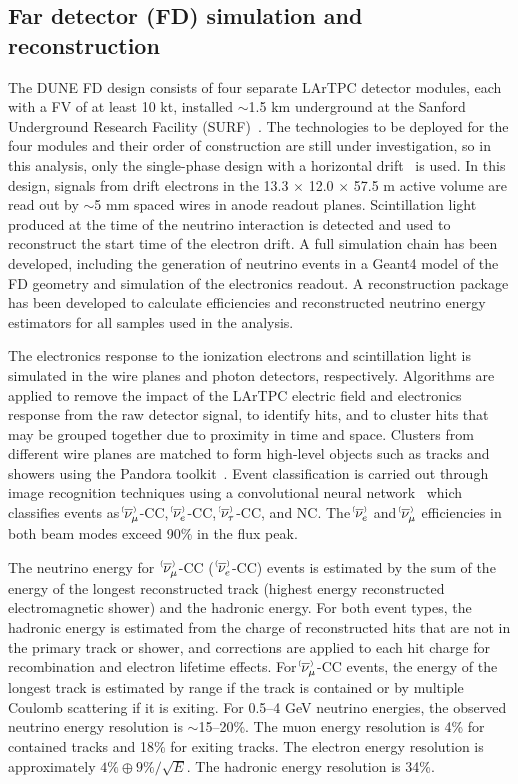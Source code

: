 \subsection{Far detector (FD) simulation and reconstruction}
The DUNE FD design consists of four separate LArTPC detector modules, each with a FV of at least 10 kt, installed $\sim$1.5 km underground at the Sanford Underground Research Facility (SURF)~\cite{Abi:2018dnh}. The technologies to be deployed for the four modules and their order of construction are still under investigation, so in this analysis, only the single-phase design with a horizontal drift~\cite{Abi:2020loh} is used. In this design, signals from drift electrons in the 13.3 $\times$ 12.0 $\times$ 57.5 m active volume are read out by $\sim$5 mm spaced wires in anode readout planes. Scintillation light produced at the time of the neutrino interaction is detected and used to reconstruct the start time of the electron drift. A full simulation chain has been developed, including the generation of neutrino events in a Geant4 model of the FD geometry and simulation of the electronics readout. A reconstruction package has been developed to calculate efficiencies and reconstructed neutrino energy estimators for all samples used in the analysis.

The electronics response to the ionization electrons and scintillation light is simulated in the wire planes and photon detectors, respectively. Algorithms are applied to remove the impact of the LArTPC electric field and electronics response from the raw detector signal, to identify hits, and to cluster hits that may be grouped together due to proximity in time and space. Clusters from different wire planes are matched to form high-level objects such as tracks and showers using the Pandora toolkit~\cite{Marshall:2015rfa,Acciarri:2017hat}. Event classification is carried out through image recognition techniques using a convolutional neural network~\cite{cvn_paper} which classifies events as $\nu^{\bracketbar}_{\mu}$-CC, $\nu^{\bracketbar}_{e}$-CC, $\nu^{\bracketbar}_{\tau}$-CC, and NC. The $\nue^{\bracketbar}$ and $\numu^{\bracketbar}$ efficiencies in both beam modes exceed 90\% in the flux peak.

The neutrino energy for $\;\nu^{\bracketbar}_{\mu}$-CC ($\;\nu^{\bracketbar}_{e}$-CC) events is estimated by the sum of the energy of the longest reconstructed track (highest energy reconstructed electromagnetic shower) and the hadronic energy. For both event types, the hadronic energy is estimated from the charge of reconstructed hits that are not in the primary track or shower, and corrections are applied to each hit charge for recombination and electron lifetime effects. For $\nu^{\bracketbar}_{\mu}$-CC events, the energy of the longest track is estimated by range if the track is contained or by multiple Coulomb scattering if it is exiting. For 0.5--4 GeV neutrino energies, the observed neutrino energy resolution is $\sim$15--20\%. The muon energy resolution is 4\% for contained tracks and 18\% for exiting tracks. The electron energy resolution is approximately $4\% \oplus 9\%/\sqrt{E}$. The hadronic energy resolution is 34\%.


